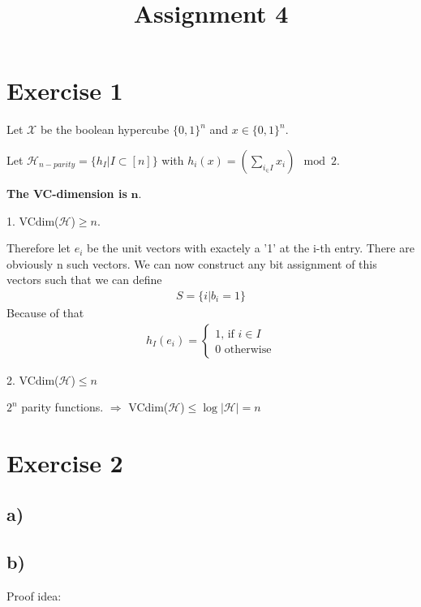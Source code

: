 \documentclass{article}
\title{Assignment 4}
\begin{document}
 \setlength{\parindent}{0em} 
\maketitle
\section*{Exercise 1}
Let $\mathcal{X}$ be the boolean hypercube $\{0,1\}^n$ and $x\in\{0,1\}^n$. 

Let $\mathcal{H}_{n-parity}=\{h_I|I\subset [n]\} $ with $h_i(x) =
(\sum_{i_\in I} x_i) \mod 2$.

\textbf{The VC-dimension is } $\mathbf{n}$.

1. VCdim($\mathcal{H}$)$\geq n$.

Therefore let $e_i$ be the unit vectors with exactely a '1' at the i-th entry.
There are obviously n such vectors. We can now construct any bit assignment of
this vectors such that we can define 
\begin{align*}
S = \{ i| b_i = 1\}
\end{align*}
Because of that 
\begin{align*}
h_I(e_i) = \begin{cases}
1 \text{, if }i\in I\\
0 \text{ otherwise}
\end{cases}
\end{align*}

2. VCdim($\mathcal{H}$)$\leq n$ 

$2^n$ parity functions. $\Rightarrow$ VCdim($\mathcal{H}$)$\leq
\log|\mathcal{H}| = n$

\section*{Exercise 2} %
\label{sec:exercise_2}
	\subsection*{a)} %
	\label{sub:a_}
	
	\subsection*{b)} %
	\label{sub:b}
		Proof idea:
		
\end{document}
